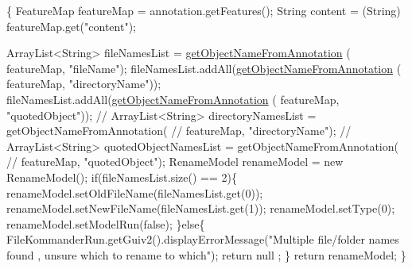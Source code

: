 \begin{DoxyCode}
                                                                               
        \{
        FeatureMap featureMap = annotation.getFeatures();
        String content = (String) featureMap.get(\textcolor{stringliteral}{"content"});
        
        ArrayList<String> fileNamesList = \hyperlink{classcom_1_1poly_1_1nlp_1_1filekommander_1_1file_1_1actions_1_1_analyse_action_a8652e1bba48585a8c416e6e212fe4766}{getObjectNameFromAnnotation}
      (
                featureMap, \textcolor{stringliteral}{"fileName"});
        fileNamesList.addAll(\hyperlink{classcom_1_1poly_1_1nlp_1_1filekommander_1_1file_1_1actions_1_1_analyse_action_a8652e1bba48585a8c416e6e212fe4766}{getObjectNameFromAnnotation}
      (
                featureMap, \textcolor{stringliteral}{"directoryName"}));
        fileNamesList.addAll(\hyperlink{classcom_1_1poly_1_1nlp_1_1filekommander_1_1file_1_1actions_1_1_analyse_action_a8652e1bba48585a8c416e6e212fe4766}{getObjectNameFromAnnotation}
      (
                featureMap, \textcolor{stringliteral}{"quotedObject"}));
\textcolor{comment}{//      ArrayList<String> directoryNamesList = getObjectNameFromAnnotation(}
\textcolor{comment}{//              featureMap, "directoryName");}
\textcolor{comment}{//      ArrayList<String> quotedObjectNamesList = getObjectNameFromAnnotation(}
\textcolor{comment}{//              featureMap, "quotedObject");}
        RenameModel renameModel = \textcolor{keyword}{new} RenameModel();
        \textcolor{keywordflow}{if}(fileNamesList.size() == 2)\{
            renameModel.setOldFileName(fileNamesList.get(0));
            renameModel.setNewFileName(fileNamesList.get(1));
            renameModel.setType(0);
            renameModel.setModelRun(\textcolor{keyword}{false});
        \}\textcolor{keywordflow}{else}\{
            FileKommanderRun.getGuiv2().displayErrorMessage(\textcolor{stringliteral}{"Multiple
       file/folder names found , unsure which to rename to which"});
            \textcolor{keywordflow}{return} null ;
        \}
        \textcolor{keywordflow}{return} renameModel;
    \}
\end{DoxyCode}
